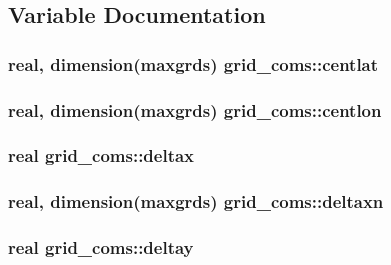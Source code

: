 \subsection{Variable Documentation}
\subsubsection[{\texorpdfstring{centlat}{centlat}}]{\setlength{\rightskip}{0pt plus 5cm}real, dimension(maxgrds) grid\+\_\+coms\+::centlat}\hypertarget{namespacegrid__coms_a88baeaebc7ead79b3b400cfa34392384}{}\label{namespacegrid__coms_a88baeaebc7ead79b3b400cfa34392384}
\subsubsection[{\texorpdfstring{centlon}{centlon}}]{\setlength{\rightskip}{0pt plus 5cm}real, dimension(maxgrds) grid\+\_\+coms\+::centlon}\hypertarget{namespacegrid__coms_a249d1ce34222c741969c77af125d21ba}{}\label{namespacegrid__coms_a249d1ce34222c741969c77af125d21ba}
\subsubsection[{\texorpdfstring{deltax}{deltax}}]{\setlength{\rightskip}{0pt plus 5cm}real grid\+\_\+coms\+::deltax}\hypertarget{namespacegrid__coms_aefac306f17fd9da10ae08206490c1d96}{}\label{namespacegrid__coms_aefac306f17fd9da10ae08206490c1d96}
\subsubsection[{\texorpdfstring{deltaxn}{deltaxn}}]{\setlength{\rightskip}{0pt plus 5cm}real, dimension(maxgrds) grid\+\_\+coms\+::deltaxn}\hypertarget{namespacegrid__coms_a6adc70cd69fe9f3ba2d1f5c8ebb9ab74}{}\label{namespacegrid__coms_a6adc70cd69fe9f3ba2d1f5c8ebb9ab74}
\subsubsection[{\texorpdfstring{deltay}{deltay}}]{\setlength{\rightskip}{0pt plus 5cm}real grid\+\_\+coms\+::deltay}\hypertarget{namespacegrid__coms_a80d44caaab6b380ba782f2e41e9c00a8}{}\label{namespacegrid__coms_a80d44caaab6b380ba782f2e41e9c00a8}
